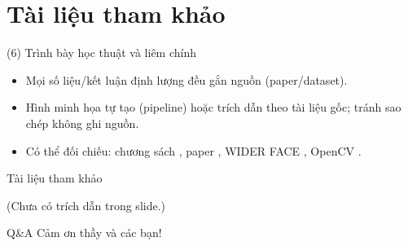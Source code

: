 \documentclass[aspectratio=169,11pt]{beamer}
\newif\ifhascites
\begin{document}
\section{Tài liệu tham khảo}

\begin{frame}{(6) Trình bày học thuật và liêm chính}
  \begin{itemize}
    \setlength{\itemsep}{6pt}
    \item Mọi số liệu/kết luận định lượng đều gắn nguồn (paper/dataset).
    \item Hình minh họa tự tạo (pipeline) hoặc trích dẫn theo tài liệu gốc; tránh sao chép không ghi nguồn.
    \item Có thể đối chiếu: chương sách \cite{li2012facechapter}, paper \cite{guo2022scrfd}, WIDER FACE \cite{yang2016widerface}, OpenCV \cite{bradski2000opencv,opencv_cascade_docs}.
  \end{itemize}
\end{frame}

\begin{frame}[allowframebreaks]{Tài liệu tham khảo}
  \ifhascites
    \printbibliography
  \else
    {\small (Chưa có trích dẫn trong slide.)}
  \fi
\end{frame}

\begin{frame}{Q\&A}
  \centering
  \Large Cảm ơn thầy và các bạn!
\end{frame}
\end{document}
